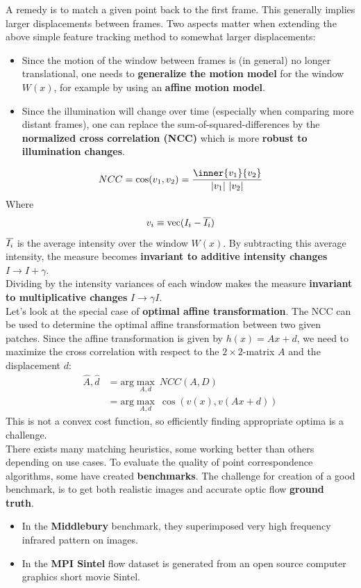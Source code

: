 A remedy is to match a given point back to the first frame.
This generally implies larger displacements between frames.
Two aspects matter when extending the above simple feature tracking
method to somewhat larger displacements:
\begin{itemize}
	\item Since the motion of the window between frames is
		(in general) no longer translational, one needs to
		\textbf{generalize the motion model} for the window $W(x)$,
		for example by using an \textbf{affine motion model}.
	\item Since the illumination will change over time
		(especially when comparing more distant frames), one can replace
		the sum-of-squared-differences by the
		\textbf{normalized cross correlation (NCC)} which is more
		\textbf{robust to illumination changes}.
\end{itemize}
\[
	NCC = \cos(v_1,v_2)
		= \frac{\inner{v_1}{v_2}}{|v_1|\ |v_2|}
\]
Where
\[
	v_i \equiv \text{vec}(I_i - \overline{I_i})
\]
$\overline{I_i}$ is the average intensity over the window $W(x)$.
By subtracting this average intensity, the measure becomes
\textbf{invariant to additive intensity changes} $I \rightarrow I + \gamma$.\\

Dividing by the intensity variances of each window makes the measure
\textbf{invariant to multiplicative changes} $I \rightarrow \gamma I$.\\

Let's look at the special case of \textbf{optimal affine transformation}.
The NCC can be used to determine the optimal affine transformation
between two given patches. Since the affine transformation is given
by $h(x) = A x + d$, we need to maximize the cross correlation
with respect to the $2\times2$-matrix $A$ and the displacement $d$:
\begin{align*}
	\widehat{A}, \widehat{d}
		& = \text{arg} \max_{A,d}\ NCC(A,D) \\
		& = \text{arg} \max_{A,d}\ \cos(v(x), v(Ax+d))
\end{align*}
This is not a convex cost function, so efficiently finding
appropriate optima is a challenge.\\

There exists many matching heuristics, some working better than others
depending on use cases. To evaluate the quality of point correspondence
algorithms, some have created \textbf{benchmarks}.
The challenge for creation of a good benchmark, is to get both
realistic images and accurate optic flow \textbf{ground truth}.
\begin{itemize}
	\item In the \textbf{Middlebury} benchmark, they superimposed
		very high frequency infrared pattern on images.
	\item In the \textbf{MPI Sintel} flow dataset is generated from
		an open source computer graphics short movie Sintel.
\end{itemize}

